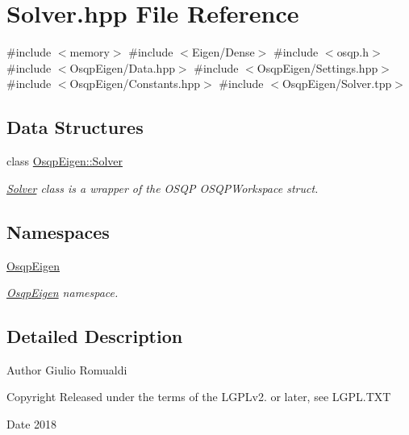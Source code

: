 \section{Solver.\+hpp File Reference}
\label{Solver_8hpp}
{\ttfamily \#include $<$memory$>$}\newline
{\ttfamily \#include $<$Eigen/\+Dense$>$}\newline
{\ttfamily \#include $<$osqp.\+h$>$}\newline
{\ttfamily \#include $<$Osqp\+Eigen/\+Data.\+hpp$>$}\newline
{\ttfamily \#include $<$Osqp\+Eigen/\+Settings.\+hpp$>$}\newline
{\ttfamily \#include $<$Osqp\+Eigen/\+Constants.\+hpp$>$}\newline
{\ttfamily \#include $<$Osqp\+Eigen/\+Solver.\+tpp$>$}\newline
\subsection*{Data Structures}
\begin{DoxyCompactItemize}
\item 
class \mbox{\hyperlink{classOsqpEigen_1_1Solver}{Osqp\+Eigen\+::\+Solver}}
\begin{DoxyCompactList}\small\item\em \mbox{\hyperlink{classOsqpEigen_1_1Solver}{Solver}} class is a wrapper of the O\+S\+QP O\+S\+Q\+P\+Workspace struct. \end{DoxyCompactList}\end{DoxyCompactItemize}
\subsection*{Namespaces}
\begin{DoxyCompactItemize}
\item 
 \mbox{\hyperlink{namespaceOsqpEigen}{Osqp\+Eigen}}
\begin{DoxyCompactList}\small\item\em \mbox{\hyperlink{namespaceOsqpEigen}{Osqp\+Eigen}} namespace. \end{DoxyCompactList}\end{DoxyCompactItemize}


\subsection{Detailed Description}
\begin{DoxyAuthor}{Author}
Giulio Romualdi 
\end{DoxyAuthor}
\begin{DoxyCopyright}{Copyright}
Released under the terms of the L\+G\+P\+Lv2. or later, see L\+G\+P\+L.\+T\+XT 
\end{DoxyCopyright}
\begin{DoxyDate}{Date}
2018 
\end{DoxyDate}
